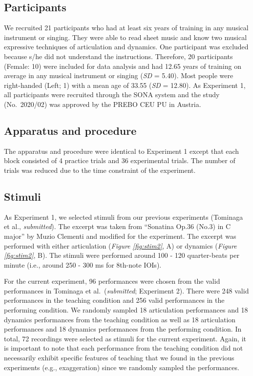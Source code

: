 \documentclass[
  man,floatsintext]{apa6}
\begin{document}
\hypertarget{participants-1}{%
\subsection{Participants}\label{participants-1}}

We recruited 21 participants who had at least six years of training in any musical instrument or singing. They were able to read sheet music and know two musical expressive techniques of articulation and dynamics. One participant was excluded because s/he did not understand the instructions. Therefore, 20 participants (Female: 10) were included for data analysis and had 12.65 years of training on average in any musical instrument or singing (\emph{SD} = 5.40). Most people were right-handed (Left; 1) with a mean age of 33.55 (\emph{SD} = 12.80). As Experiment 1, all participants were recruited through the SONA system and the study (No.~2020/02) was approved by the PREBO CEU PU in Austria.

\hypertarget{apparatus-and-procedure}{%
\subsection{Apparatus and procedure}\label{apparatus-and-procedure}}

The apparatus and procedure were identical to Experiment 1 except that each block consisted of 4 practice trials and 36 experimental trials. The number of trials was reduced due to the time constraint of the experiment.

\hypertarget{stimuli-1}{%
\subsection{Stimuli}\label{stimuli-1}}

As Experiment 1, we selected stimuli from our previous experiments (Tominaga et al., \emph{submitted}). The excerpt was taken from ``Sonatina Op.36 (No.3) in C major'' by Muzio Clementi and modified for the experiment. The excerpt was performed with either articulation (\emph{Figure \ref{fig:stim2}}, A) or dynamics (\emph{Figure \ref{fig:stim2}}, B). The stimuli were performed around 100 - 120 quarter-beats per minute (i.e., around 250 - 300 ms for 8th-note IOIs).

For the current experiment, 96 performances were chosen from the valid performances in Tominaga et al.~(\emph{submitted}; Experiment 2). There were 248 valid performances in the teaching condition and 256 valid performances in the performing condition. We randomly sampled 18 articulation performances and 18 dynamics performances from the teaching condition as well as 18 articulation performances and 18 dynamics performances from the performing condition. In total, 72 recordings were selected as stimuli for the current experiment. Again, it is important to note that each performance from the teaching condition did not necessarily exhibit specific features of teaching that we found in the previous experiments (e.g., exaggeration) since we randomly sampled the performances.
\end{document}
